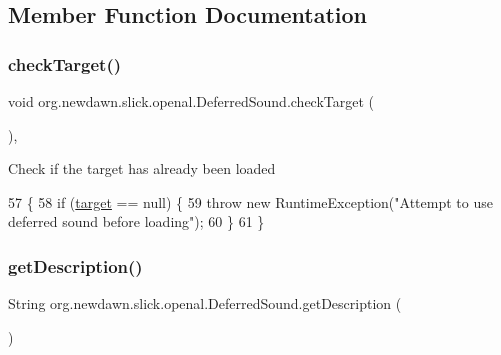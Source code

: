 \subsection{Member Function Documentation}
\mbox{\label{classorg_1_1newdawn_1_1slick_1_1openal_1_1_deferred_sound_a63fc1a65a177fcaeb93ba0a071c10086}} 
\subsubsection{\texorpdfstring{check\+Target()}{checkTarget()}}
{\footnotesize\ttfamily void org.\+newdawn.\+slick.\+openal.\+Deferred\+Sound.\+check\+Target (\begin{DoxyParamCaption}{ }\end{DoxyParamCaption})\hspace{0.3cm}{\ttfamily [inline]}, {\ttfamily [private]}}

Check if the target has already been loaded 
\begin{DoxyCode}
57                                \{
58         \textcolor{keywordflow}{if} (\mbox{\hyperlink{classorg_1_1newdawn_1_1slick_1_1openal_1_1_deferred_sound_ab156655c2d91c0a6bbec8bd4438ac875}{target}} == null) \{
59             \textcolor{keywordflow}{throw} \textcolor{keyword}{new} RuntimeException(\textcolor{stringliteral}{"Attempt to use deferred sound before loading"});
60         \}
61     \}
\end{DoxyCode}
\mbox{\label{classorg_1_1newdawn_1_1slick_1_1openal_1_1_deferred_sound_ade00f475d697e1a4152be52b478210cc}} 
\subsubsection{\texorpdfstring{get\+Description()}{getDescription()}}
{\footnotesize\ttfamily String org.\+newdawn.\+slick.\+openal.\+Deferred\+Sound.\+get\+Description (\begin{DoxyParamCaption}{ }\end{DoxyParamCaption})\hspace{0.3cm}{\ttfamily [inline]}}


